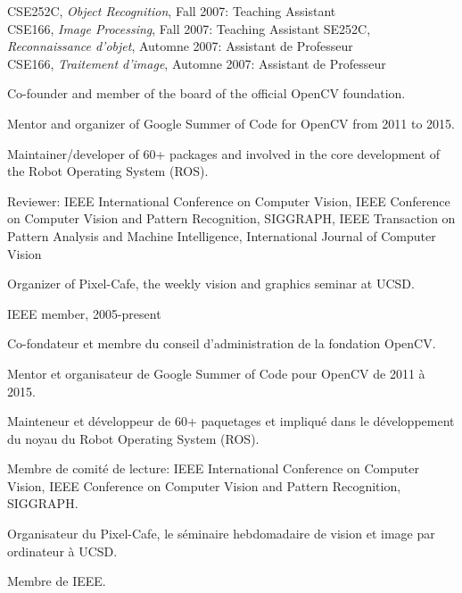 \documentclass{article}
\begin{document}
\begin{llist}
{
}
{
}
{
CSE252C, {\em Object Recognition}, Fall 2007: Teaching Assistant\\
CSE166, {\em Image Processing}, Fall 2007: Teaching Assistant
}
{
SE252C, {\em Reconnaissance d'objet}, Automne 2007: Assistant de Professeur\\
CSE166, {\em Traitement d'image}, Automne 2007: Assistant de Professeur
}

{

Co-founder and member of the board of the official OpenCV foundation.

Mentor and organizer of Google Summer of Code for OpenCV from 2011 to 2015.

Maintainer/developer of 60+ packages and involved in the core development of the Robot Operating System (ROS).

Reviewer: IEEE International Conference on Computer Vision, IEEE Conference on Computer Vision and Pattern Recognition, 
SIGGRAPH, IEEE Transaction on Pattern Analysis and Machine Intelligence, International Journal of Computer Vision

Organizer of Pixel-Cafe, the weekly vision and graphics seminar at UCSD.

IEEE member, 2005-present
}
{

Co-fondateur et membre du conseil d'administration de la fondation OpenCV.

Mentor et organisateur de Google Summer of Code pour OpenCV de 2011 \`{a} 2015.

Mainteneur et d\'{e}veloppeur de 60+ paquetages et impliqu\'{e} dans le d\'{e}veloppement du
noyau du Robot Operating System (ROS).

Membre de comit\'{e} de lecture: IEEE International Conference on Computer Vision, IEEE Conference on Computer Vision 
and Pattern Recognition, SIGGRAPH.

Organisateur du Pixel-Cafe, le s\'{e}minaire hebdomadaire de vision et image par ordinateur \`{a} UCSD.

Membre de IEEE.
}


\end{llist}
\end{document}

